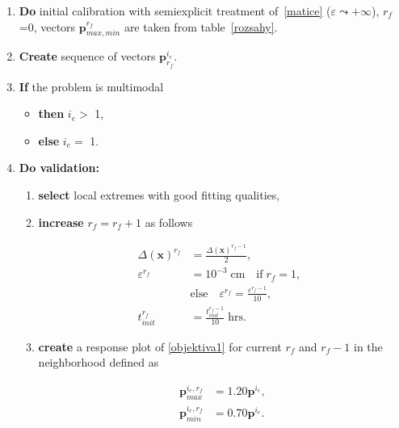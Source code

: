 \documentclass[review,times,3p,twocolumn,10pt]{elsarticle}
\newenvironment{lineq}
    {\begin{linenomath*}
    \begin{equation}
    }
    { 
    \end{equation} 
    \end{linenomath*}
    }
\renewcommand{\vec}{\mathbf}
\begin{document}
 \begin{enumerate}[label={\bf \Roman* .}]
    \item  {\bf Do} initial calibration with semiexplicit treatment of~\eqref{matice} ($\varepsilon \leadsto +\infty$), $r_f$=0,  vectors $\vec{p}_{max,min}^{r_f}$ are taken from table~\ref{rozsahy}. 
     \item \label{docal} {\bf Create}  sequence of vectors $\vec{p}^{i_e}_{r_f}$. 
     \item {\bf If} the problem is multimodal 
       \begin{itemize} 
           \item {\bf then} $i_e > $ 1, 
           \item {\bf else} $i_e = $ 1.
       \end{itemize} 
 \item {\bf Do validation:}  
    \begin{enumerate} 
      \item {\bf select} local extremes with good fitting qualities,
        \item {\bf increase} $r_f=r_f+1$ as follows 
                  \begin{lineq}
                  \label{coeffs}
                  \begin{split}
                  \Delta(\vec{x})^{r_f}  &= \frac{\Delta(\vec{x})^{r_f-1}}{2}, \\
                  \varepsilon^{r_f} &= 10^{-3} \; \mbox{cm} \quad  \mbox{if} \; r_f = 1, \; \; \\ &\mbox{else} \quad \varepsilon^{r_f} = \frac{\varepsilon^{r_f-1}}{10}, \\
                  t_{init}^{r_f} &=  \frac{t_{init}^{r_f-1}}{10} \; \mbox{hrs} .
                  \end{split}
                  \end{lineq}
        \item {\bf create} a response plot of \eqref{objektiva1} for current $r_f$ and $r_f-1$ in the neighborhood defined as 
            \begin{lineq}
            \label{parrange}
              \begin{split}
              \vec{p}^{i_e, r_f}_{max} &= 1.20\vec{p}^{i_e}, \\
              \vec{p}^{i_e,r_f}_{min} &= 0.70\vec{p}^{i_e}. 
              \end{split}
            \end{lineq}
            

\end{enumerate}
\end{enumerate}
\end{document}
